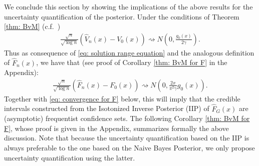 We conclude this section by showing the implications of the above results for the uncertainty quantification of the posterior. Under the conditions of Theorem \ref{thm: BvM} (c.f.\ \cite{27}) 
\begin{align*}
	\frac{\sqrt{n}}{\sqrt{\log n}}\left(\hat{V}_n(x) - V_0(x)\right) \rightsquigarrow N\left(0, \frac{g_0(x)}{2 \gamma}\right).
\end{align*}
Thus as consequence of \eqref{eq: solution range equation} and the analogous definition of $\hat{F}_n(x)$, we have that (see proof of Corollary \ref{thm: BvM for F} in the Appendix):
\begin{align}\label{eq: convergence IIE for F}
	\frac{\sqrt{n}}{\sqrt{\log n}}\left(\hat{F}_n(x) - F_0(x)\right) \rightsquigarrow N\left(0, \frac{2 x}{\pi^2 \gamma} g_0(x)\right).
\end{align}
Together with \eqref{eq: convergence for F} below, this will imply that the credible intervals constructed from the Isotonized Inverse Posterior (IIP) of $\hat{F}_{\scriptscriptstyle{G}}(x)$ are (asymptotic) frequentist confidence sets. The following Corollary \ref{thm: BvM for F}, whose proof is given in the Appendix, summarizes formally the above discussion. Note that because the uncertainty quantification based on the IIP is always preferable to the one based on the Naive Bayes Posterior, we only propose uncertainty quantification using the latter.

